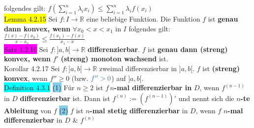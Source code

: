 \documentclass[landscape, 10pt]{article}
\newcommand{\R}{\mathbb{R}}
\begin{document}
\begin{multicols}{3}
                     folgendes gilt: \textcolor{NavyBlue}{
                     $f(\sum_{i=1}^n\lambda_i x_i)
                     \leqslant\sum_{i=1}^n\lambda_if(x_i)$}\\
              \colorbox{yellow}{Lemma 4.2.15} 
                     Sei \textcolor{NavyBlue}{$f:I\longrightarrow\R$} 
                     eine beliebige Funktion. Die Funktion \textcolor{NavyBlue}{$f$}
                     ist \textbf{genau dann konvex, wenn} 
                     \textcolor{NavyBlue}{$\forall x_0<x<x_1$} in 
                     \textcolor{NavyBlue}{$I$}
                     folgendes gilt: \textcolor{NavyBlue}{
                     $\frac{f(x)-f(x_0)}{x-x_0}\leqslant\frac{f(x_1)-f(x)}{x_1-x}$}\\ 
              \colorbox{magenta}{Satz 4.2.16} 
                     Sei \textcolor{NavyBlue}{$f:]a,b[\longrightarrow\R$}
                     \textbf{differenzierbar}. 
                     \textcolor{NavyBlue}{$f$} ist 
                     \textbf{genau dann (streng) konvex, wenn} 
                     \textcolor{NavyBlue}{$f'$} \textbf{(streng) monoton
                     wachsend} ist.\\
              \colorbox{BurntOrange}{Korollar 4.2.17} 
                     Sei \textcolor{NavyBlue}{$f:]a,b[\longrightarrow\R$}
                     zweimal differenzierbar in \textcolor{NavyBlue}{$]a,b[$}. 
                     \textcolor{NavyBlue}{$f$} ist \textbf{(streng) konvex}, 
                     wenn \textcolor{NavyBlue}{$f''\geqslant0$} (bzw. 
                     $\textcolor{NavyBlue}{f''>0}$) auf 
                     \textcolor{NavyBlue}{$]a,b[$}.\\
              \colorbox{cyan}{Definition 4.3.1} 
                     \colorbox{SkyBlue}{(1)} Für $n\geqslant2$ ist 
                     $f\,n$\textbf{-mal differenzierbar in} $D$, wenn 
                     \textcolor{NavyBlue}{$f^{(n-1)}$} in \textcolor{NavyBlue}{$D$}
                     \textbf{differenzierbar} ist. 
                     Dann ist \textcolor{NavyBlue}{$f^{(n)}:=(f^{(n-1)})'$} 
                     und nennt sich die $n$\textbf{-te Ableitung} von 
                     \textcolor{NavyBlue}{$f$}
                     \colorbox{SkyBlue}{(2)} \textcolor{NavyBlue}{$f$} 
                     ist $n$\textbf{-mal stetig differenzierbar} in 
                     \textcolor{NavyBlue}{$D$}, 
                     wenn \textcolor{NavyBlue}{$f$} 
                     \textbf{$n$-mal differenzierbar} in \textcolor{NavyBlue}{$D$}
                     \& \textcolor{NavyBlue}{$f^{(n)}$} 

\end{multicols}
\end{document}
